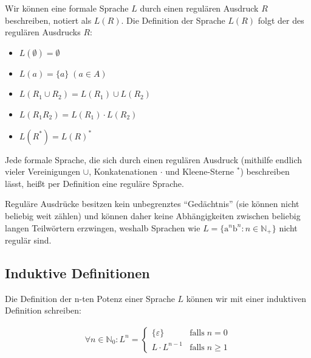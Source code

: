 \documentclass[12pt,a4paper,oneside]{article}
\newcommand{\afz}[1]{\enquote{#1}}
\newcommand{\emptyline}{\hspace*{\fill}}
\newcommand{\N}{\mathbb{N}}
\newcommand{\If}[1]{\text{falls}\; #1}
\begin{document}
            Wir können eine formale Sprache $L$ durch einen regulären Ausdruck $R$ beschreiben, notiert als $L(R)$.
            Die Definition der Sprache $L(R)$ folgt der des regulären Ausdrucks $R$:

            \begin{itemize}
                \item $L(\emptyset) = \emptyset$
                \item $L(a) = \{a\} \; (a \in A)$
                \item $L(R_1 \cup R_2) = L(R_1) \cup L(R_2)$
                \item $L(R_1 R_2) = L(R_1) \cdot L(R_2)$
                \item $L(R^*) = L(R)^*$
            \end{itemize}

            \newpage

            Jede formale Sprache, die sich durch einen regulären Ausdruck (mithilfe endlich vieler Vereinigungen $\cup$,
            Konkatenationen $\cdot$ und Kleene-Sterne $^*$) beschreiben lässt,
            heißt per Definition eine reguläre Sprache.

            \emptyline

            Reguläre Ausdrücke besitzen kein unbegrenztes \afz{Gedächtnis} (sie können nicht beliebig weit zählen)
            und können daher keine Abhängigkeiten zwischen beliebig langen Teilwörtern erzwingen,
            weshalb Sprachen wie $L = \{\text{a}^n\text{b}^n : n \in \N_+\}$ nicht regulär sind. 

        \subsection{Induktive Definitionen}

            Die Definition der n-ten Potenz einer Sprache $L$ können wir mit einer induktiven Definition schreiben:

            \vspace{-1em}
            \begin{align*}
                \forall n \in \N_0: L^n =
                \begin{cases}
                    \{\varepsilon\} &\If{n = 0} \\
                    L \cdot L^{n-1} &\If{n \geq 1}
                \end{cases}
            \end{align*}
\end{document}
